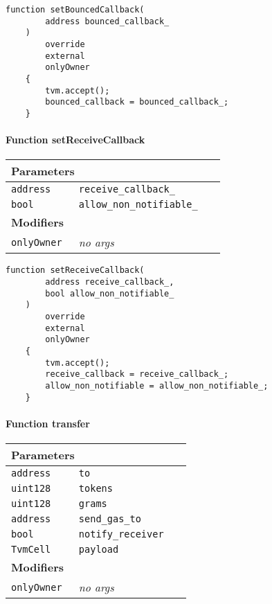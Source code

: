 \vspace{2cm}

\begin{lstlisting}[firstnumber=568]
    function setBouncedCallback(
        address bounced_callback_
    )
        override
        external
        onlyOwner
    {
        tvm.accept();
        bounced_callback = bounced_callback_;
    }
\end{lstlisting}

\paragraph{Function setReceiveCallback}


\ifsoltables
\noindent\begin{tabular}{|l|l|p{5cm}|}\hline
\multicolumn{3}{|l|}{\bf Parameters}\\\hline
\tt address & \tt receive\_{}callback\_{} &\\\hline
\tt bool & \tt allow\_{}non\_{}notifiable\_{} &\\\hline
\multicolumn{3}{|l|}{\bf Modifiers}\\\hline
\tt onlyOwner & {\em no args} &\\\hline
\end{tabular}
\fi

\vspace{2cm}

\begin{lstlisting}[firstnumber=550]
    function setReceiveCallback(
        address receive_callback_,
        bool allow_non_notifiable_
    )
        override
        external
        onlyOwner
    {
        tvm.accept();
        receive_callback = receive_callback_;
        allow_non_notifiable = allow_non_notifiable_;
    }
\end{lstlisting}

\paragraph{Function transfer}


\ifsoltables
\noindent\begin{tabular}{|l|l|p{5cm}|}\hline
\multicolumn{3}{|l|}{\bf Parameters}\\\hline
\tt address & \tt to &\\\hline
\tt uint128 & \tt tokens &\\\hline
\tt uint128 & \tt grams &\\\hline
\tt address & \tt send\_{}gas\_{}to &\\\hline
\tt bool & \tt notify\_{}receiver &\\\hline
\tt TvmCell & \tt payload &\\\hline
\multicolumn{3}{|l|}{\bf Modifiers}\\\hline
\tt onlyOwner & {\em no args} &\\\hline
\end{tabular}
\fi

